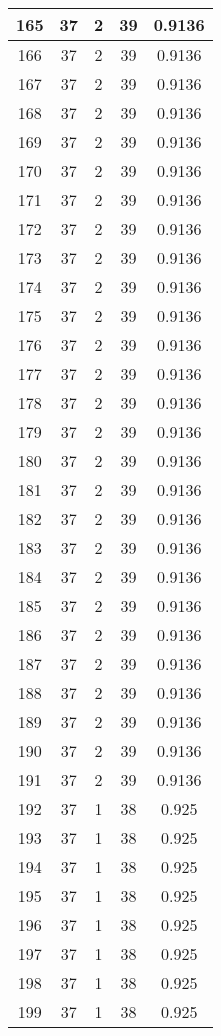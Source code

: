 \documentclass[letterpaper, 12pt]{article}
\begin{document}
\begin{longtable}{|c|c|c|c|c|}
\hline
165 & 37 & 2 & 39 & 0.9136 \\
\hline
166 & 37 & 2 & 39 & 0.9136 \\
\hline
167 & 37 & 2 & 39 & 0.9136 \\
\hline
168 & 37 & 2 & 39 & 0.9136 \\
\hline
169 & 37 & 2 & 39 & 0.9136 \\
\hline
170 & 37 & 2 & 39 & 0.9136 \\
\hline
171 & 37 & 2 & 39 & 0.9136 \\
\hline
172 & 37 & 2 & 39 & 0.9136 \\
\hline
173 & 37 & 2 & 39 & 0.9136 \\
\hline
174 & 37 & 2 & 39 & 0.9136 \\
\hline
175 & 37 & 2 & 39 & 0.9136 \\
\hline
176 & 37 & 2 & 39 & 0.9136 \\
\hline
177 & 37 & 2 & 39 & 0.9136 \\
\hline
178 & 37 & 2 & 39 & 0.9136 \\
\hline
179 & 37 & 2 & 39 & 0.9136 \\
\hline
180 & 37 & 2 & 39 & 0.9136 \\
\hline
181 & 37 & 2 & 39 & 0.9136 \\
\hline
182 & 37 & 2 & 39 & 0.9136 \\
\hline
183 & 37 & 2 & 39 & 0.9136 \\
\hline
184 & 37 & 2 & 39 & 0.9136 \\
\hline
185 & 37 & 2 & 39 & 0.9136 \\
\hline
186 & 37 & 2 & 39 & 0.9136 \\
\hline
187 & 37 & 2 & 39 & 0.9136 \\
\hline
188 & 37 & 2 & 39 & 0.9136 \\
\hline
189 & 37 & 2 & 39 & 0.9136 \\
\hline
190 & 37 & 2 & 39 & 0.9136 \\
\hline
191 & 37 & 2 & 39 & 0.9136 \\
\hline
192 & 37 & 1 & 38 & 0.925 \\
\hline
193 & 37 & 1 & 38 & 0.925 \\
\hline
194 & 37 & 1 & 38 & 0.925 \\
\hline
195 & 37 & 1 & 38 & 0.925 \\
\hline
196 & 37 & 1 & 38 & 0.925 \\
\hline
197 & 37 & 1 & 38 & 0.925 \\
\hline
198 & 37 & 1 & 38 & 0.925 \\
\hline
199 & 37 & 1 & 38 & 0.925 \\
\hline
\end{longtable}
\end{document}
